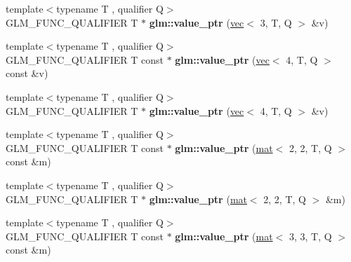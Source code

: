 \begin{DoxyCompactItemize}
\item 
\mbox{\label{group__gtc__type__ptr_gabca52e90fd530ff2e8344d3f66326ccd}} 
{\footnotesize template$<$typename T , qualifier Q$>$ }\\G\+L\+M\+\_\+\+F\+U\+N\+C\+\_\+\+Q\+U\+A\+L\+I\+F\+I\+ER T $\ast$ {\bfseries glm\+::value\+\_\+ptr} (\hyperlink{structglm_1_1vec}{vec}$<$ 3, T, Q $>$ \&v)
\item 
\mbox{\label{group__gtc__type__ptr_gace63685baa09872656962c2695900c48}} 
{\footnotesize template$<$typename T , qualifier Q$>$ }\\G\+L\+M\+\_\+\+F\+U\+N\+C\+\_\+\+Q\+U\+A\+L\+I\+F\+I\+ER T const  $\ast$ {\bfseries glm\+::value\+\_\+ptr} (\hyperlink{structglm_1_1vec}{vec}$<$ 4, T, Q $>$ const \&v)
\item 
\mbox{\label{group__gtc__type__ptr_gae0ad6ab684abf10a87cadb95a9137fa2}} 
{\footnotesize template$<$typename T , qualifier Q$>$ }\\G\+L\+M\+\_\+\+F\+U\+N\+C\+\_\+\+Q\+U\+A\+L\+I\+F\+I\+ER T $\ast$ {\bfseries glm\+::value\+\_\+ptr} (\hyperlink{structglm_1_1vec}{vec}$<$ 4, T, Q $>$ \&v)
\item 
\mbox{\label{group__gtc__type__ptr_ga6144a4839923074f038b63506b855faf}} 
{\footnotesize template$<$typename T , qualifier Q$>$ }\\G\+L\+M\+\_\+\+F\+U\+N\+C\+\_\+\+Q\+U\+A\+L\+I\+F\+I\+ER T const  $\ast$ {\bfseries glm\+::value\+\_\+ptr} (\hyperlink{structglm_1_1mat}{mat}$<$ 2, 2, T, Q $>$ const \&m)
\item 
\mbox{\label{group__gtc__type__ptr_gac636dcc35b194f5e950a3d0fb9ef44ef}} 
{\footnotesize template$<$typename T , qualifier Q$>$ }\\G\+L\+M\+\_\+\+F\+U\+N\+C\+\_\+\+Q\+U\+A\+L\+I\+F\+I\+ER T $\ast$ {\bfseries glm\+::value\+\_\+ptr} (\hyperlink{structglm_1_1mat}{mat}$<$ 2, 2, T, Q $>$ \&m)
\item 
\mbox{\label{group__gtc__type__ptr_gad80f09b66c6f11043ea79e506d141594}} 
{\footnotesize template$<$typename T , qualifier Q$>$ }\\G\+L\+M\+\_\+\+F\+U\+N\+C\+\_\+\+Q\+U\+A\+L\+I\+F\+I\+ER T const  $\ast$ {\bfseries glm\+::value\+\_\+ptr} (\hyperlink{structglm_1_1mat}{mat}$<$ 3, 3, T, Q $>$ const \&m)

\end{DoxyCompactItemize}
